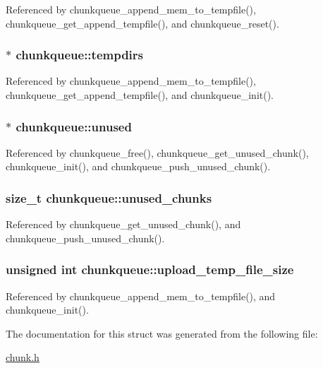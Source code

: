 Referenced by chunkqueue\-\_\-append\-\_\-mem\-\_\-to\-\_\-tempfile(), chunkqueue\-\_\-get\-\_\-append\-\_\-tempfile(), and chunkqueue\-\_\-reset().

\hypertarget{structchunkqueue_a4f9d4ef6fff55acab69a952162f78609}{
\subsubsection[{tempdirs}]{$\ast$ chunkqueue\-::tempdirs}}\label{structchunkqueue_a4f9d4ef6fff55acab69a952162f78609}


Referenced by chunkqueue\-\_\-append\-\_\-mem\-\_\-to\-\_\-tempfile(), chunkqueue\-\_\-get\-\_\-append\-\_\-tempfile(), and chunkqueue\-\_\-init().

\hypertarget{structchunkqueue_ab5539b69a2b6b74f002664afbf06411b}{
\subsubsection[{unused}]{$\ast$ chunkqueue\-::unused}}\label{structchunkqueue_ab5539b69a2b6b74f002664afbf06411b}


Referenced by chunkqueue\-\_\-free(), chunkqueue\-\_\-get\-\_\-unused\-\_\-chunk(), chunkqueue\-\_\-init(), and chunkqueue\-\_\-push\-\_\-unused\-\_\-chunk().

\hypertarget{structchunkqueue_a9eefb89b6829173ec5f5dffaca172834}{
\subsubsection[{unused\-\_\-chunks}]{\setlength{\rightskip}{0pt plus 5cm}size\-\_\-t chunkqueue\-::unused\-\_\-chunks}}\label{structchunkqueue_a9eefb89b6829173ec5f5dffaca172834}


Referenced by chunkqueue\-\_\-get\-\_\-unused\-\_\-chunk(), and chunkqueue\-\_\-push\-\_\-unused\-\_\-chunk().

\hypertarget{structchunkqueue_a68483cb4b4bee6c1898c6632e8ddd6d5}{
\subsubsection[{upload\-\_\-temp\-\_\-file\-\_\-size}]{\setlength{\rightskip}{0pt plus 5cm}unsigned int chunkqueue\-::upload\-\_\-temp\-\_\-file\-\_\-size}}\label{structchunkqueue_a68483cb4b4bee6c1898c6632e8ddd6d5}


Referenced by chunkqueue\-\_\-append\-\_\-mem\-\_\-to\-\_\-tempfile(), and chunkqueue\-\_\-init().



The documentation for this struct was generated from the following file\-:\begin{DoxyCompactItemize}
\item 
\hyperlink{chunk_8h}{chunk.\-h}\end{DoxyCompactItemize}
